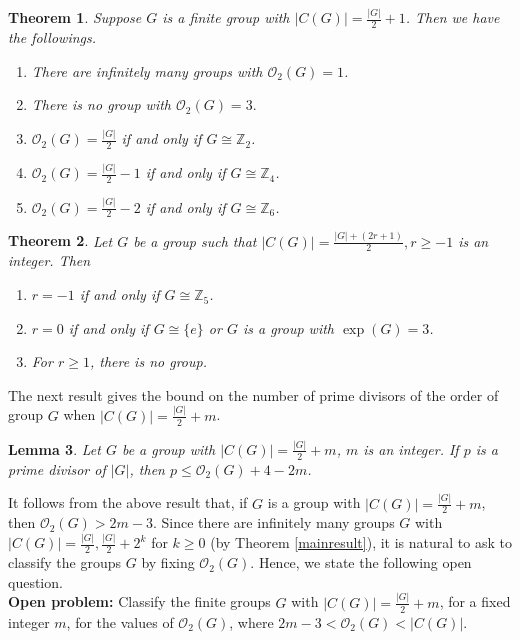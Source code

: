 \documentclass[a4paper,11pt]{amsart}
\numberwithin{equation}{section}
\numberwithin{equation}{subsection}
\newtheorem{theorem}{Theorem}[section]
\newtheorem{lemma}[theorem]{Lemma}
\begin{document}
  
  \begin{theorem}\label{mainresult_4}
Suppose $G$ is a finite group with $|C(G)|=\frac{|G|}{2}+1$. Then we have the followings.  
\begin{enumerate} 
\item There are infinitely many groups with $\mathcal{O}_{2}(G)=1$.
\item  There is no group with $\mathcal{O}_{2}(G)=3.$
    \item $\mathcal{O}_{2}(G)=\frac{|G|}{2}$ if and only if $G\cong \mathbb{Z}_{2}$.
    \item $\mathcal{O}_{2}(G)=\frac{|G|}{2}-1$ if and only if $G\cong \mathbb{Z}_{4}$.
    \item $\mathcal{O}_{2}(G)=\frac{|G|}{2}-2$ if and only if $G\cong \mathbb{Z}_{6}$.
\end{enumerate}
\end{theorem}

\begin{theorem}\label{mainresult_5}
 Let $G$ be a group such that $|C(G)|=\frac{|G|+(2r+1)}{2}, r\geq -1$ is an integer. 
 Then \begin{enumerate}
        \item $r=-1$ if and only if $G\cong \mathbb{Z}_5$.
        
\item $r=0$ if and only if $G\cong\{e\}$ or $G$ is a group with $\exp(G)=3$.
\item For $r\geq 1$, there is no group.
    \end{enumerate}

 \end{theorem}
 
 
 The next result gives the bound on the number of prime divisors of the order of group $G$ when  $|C(G)|=\frac{|G|}{2}+m$. 
\begin{lemma}\label{bound}
Let $G$ be a group with $|C(G)|=\frac{|G|}{2}+m$, $m$ is an integer. If $p$ is a prime divisor of $|G|$, then $p\leq \mathcal{O}_2(G)+4-2m$.
\end{lemma}
It follows from the above result that, if $G$ is a group with $|C(G)|=\frac{|G|}{2}+m$, then $\mathcal{O}_2(G)>2m-3$.
Since there are infinitely many groups $G$ with $|C(G)|=\frac{|G|}{2}, \frac{|G|}{2}+2^k$ for $k \geq 0$ (by Theorem \ref{mainresult}), it is natural to ask to classify the groups $G$ by fixing $\mathcal{O}_{2}(G)$. Hence, we state the following open question.\\

\noindent \textbf{Open problem:} Classify the finite groups $G$ with $|C(G)|=\frac{|G|}{2}+ m$, for a fixed integer $m$, for the values of $\mathcal{O}_{2}(G)$, where $2m-3<\mathcal{O}_{2}(G)< |C(G)|$.
\end{document}
